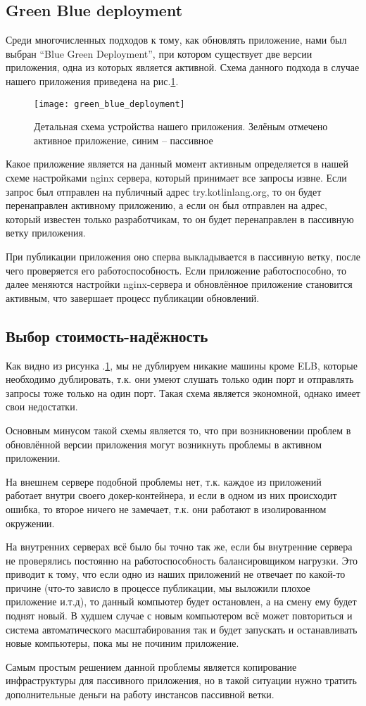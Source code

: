 \subsection{Green Blue deployment}
	Среди многочисленных подходов к тому, как обновлять приложение, нами был выбран ``Blue Green Deployment'', при котором существует две версии приложения, одна из которых является активной. Схема данного подхода в случае нашего приложения приведена на рис.\ref{fig:green_blue_deployment}.
\begin{figure}[h]
    \centering
    \texttt{[image: green\_blue\_deployment]} 
    \caption{Детальная схема устройства нашего приложения. Зелёным отмечено активное приложение, синим -- пассивное}
    \label{fig:green_blue_deployment}
\end{figure}

	Какое приложение является на данный момент активным определяется в нашей схеме настройками nginx сервера, который принимает все запросы извне. Если запрос был отправлен на публичный адрес try.kotlinlang.org, то он будет перенаправлен активному приложению, а если он был отправлен на адрес, который известен только разработчикам, то он будет перенаправлен в пассивную ветку приложения.
	
	При публикации приложения оно сперва выкладывается в пассивную ветку, после чего проверяется его работоспособность. Если приложение работоспособно, то далее меняются настройки nginx-сервера  и обновлённое приложение становится активным, что завершает процесс публикации обновлений.
\subsection{Выбор стоимость-надёжность}
	Как видно из рисунка .\ref{fig:green_blue_deployment}, мы не дублируем никакие машины кроме ELB, которые необходимо дублировать, т.к. они умеют слушать только один порт и отправлять запросы тоже только на один порт. Такая схема является экономной, однако имеет свои недостатки.
	
	Основным минусом такой схемы является то, что при возникновении проблем в обновлённой версии приложения могут возникнуть проблемы в активном приложении.
	
	На внешнем сервере подобной проблемы нет, т.к. каждое из приложений работает внутри своего докер-контейнера, и если в одном из них происходит ошибка, то второе ничего не замечает, т.к. они работают в изолированном окружении.
	
	На внутренних серверах всё было бы точно так же, если бы внутренние сервера не проверялись постоянно на работоспособность балансировщиком нагрузки. Это приводит к тому, что если одно из наших приложений не отвечает по какой-то причине (что-то зависло в процессе публикации, мы выложили плохое приложение и.т.д), то данный компьютер будет остановлен, а на смену ему будет поднят новый. В худшем случае с новым компьютером всё может повториться и система автоматического масштабирования так и будет запускать и останавливать новые компьютеры, пока мы не починим приложение.
	
	Самым простым решением данной проблемы является копирование инфраструктуры для пассивного приложения, но в такой ситуации нужно тратить дополнительные деньги на работу инстансов пассивной ветки.